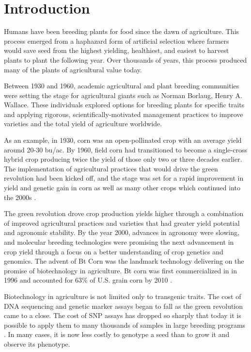 \section{Introduction} \label{sec:gen-intro}

Humans have been breeding plants for food since the dawn of agriculture. This process
emerged from a haphazard form of artificial selection where farmers would save seed from the 
highest yielding, healthiest, and easiest to harvest plants to plant the following year. 
Over thousands of years, this process produced many of the plants of  
agricultural value today.

Between 1930 and 1960, academic agricultural and plant breeding communities were setting the
stage for agricultural giants such as Norman Borlaug, Henry A. Wallace. These individuals 
explored options for breeding plants for specific traits and applying rigorous, 
scientifically-motivated management practices to improve varieties and the total yield 
of agriculture worldwide.

As an example, in 1930, corn was an open-pollinated crop with an average 
yield around 20-30 bu/ac. By 1960, field corn had transitioned to become a single-cross 
hybrid crop producing twice the yield of those only two or three decades earlier. The implementation
of agricultural practices that would drive the green revolution had been kicked off, and
the stage was set for a rapid improvement in yield and genetic gain in
corn as well as many other crops which continued into the 2000s \citep{evenson2003}.

The green revolution drove crop production yields higher through a combination of 
improved agricultural practices and varieties that had greater yield potential
and agronomic stability. By the year 2000, advances in agronomy were slowing, and 
molecular breeding technologies were promising the next advancement in crop yield
through a focus on a better understanding of crop genetics and genomics. 
The advent of Bt Corn was the landmark technology delivering on the promise of 
biotechnology in agriculture. Bt corn was first commercialized in in 1996 and 
accounted for 63\% of U.S. grain corn by 2010 \citep{fernandez2012}. 

Biotechnology in agriculture is not limited only to transgenic traits. The cost of 
DNA sequencing and genetic marker assays began to fall as the green revolution
came to a close. The cost of SNP assays has dropped so sharply that today it is 
possible to apply them to many thousands of samples in large breeding programs \citep{hiremath2012}. 
In many cases, it is now less costly to genotype a seed than to grow it and observe its phenotype.

